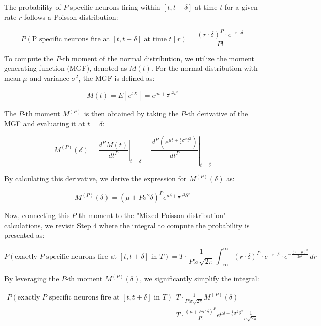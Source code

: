 The probability of \(P\) specific neurons firing within \([t, t + \delta]\) at time \(t\) for a given rate \(r\) follows a Poisson distribution:

\begin{equation}
P(\text{P specific neurons fire at } [t, t + \delta] \text{ at time } t \mid r) = \frac{{(r \cdot \delta)^P \cdot e^{-r \cdot \delta}}}{{P!}}
\end{equation}

To compute the \(P\)-th moment of the normal distribution, we utilize the moment generating function (MGF), denoted as \(M(t)\). For the normal distribution with mean \(\mu\) and variance \(\sigma^2\), the MGF is defined as:

\begin{equation}
M(t) = E[e^{tX}] = e^{\mu t + \frac{1}{2}\sigma^2 t^2}
\end{equation}

The \(P\)-th moment \(M^{(P)}\) is then obtained by taking the \(P\)-th derivative of the MGF and evaluating it at \(t = \delta\):

\begin{equation}
M^{(P)}(\delta) = \left. \frac{{d^P M(t)}}{{dt^P}} \right|_{t=\delta} = \left. \frac{{d^P \left( e^{\mu t + \frac{1}{2}\sigma^2 t^2} \right)}}{{dt^P}} \right|_{t=\delta}
\end{equation}

By calculating this derivative, we derive the expression for \(M^{(P)}(\delta)\) as:

\begin{equation}
M^{(P)}(\delta) = (\mu + P\sigma^2\delta)^P e^{\mu\delta + \frac{1}{2}\sigma^2 \delta^2}
\end{equation}

Now, connecting this \(P\)-th moment to the "Mixed Poisson distribution" calculations, we revisit Step 4 where the integral to compute the probability is presented as:

\begin{equation}
P(\text{exactly } P \text{ specific neurons fire at } [t, t + \delta] \text{ in } T) = T \cdot \frac{1}{P! \sigma \sqrt{2\pi}} \int_{-\infty}^{\infty} (r \cdot \delta)^P \cdot e^{-r \cdot \delta} \cdot e^{-\frac{(r-\mu)^2}{2\sigma^2}} \, dr
\end{equation}

By leveraging the \(P\)-th moment \(M^{(P)}(\delta)\), we significantly simplify the integral:

\begin{equation}
\begin{aligned}
P(\text{exactly } P \text{ specific neurons fire at } [t, t + \delta] \text{ in } T) &= T \cdot \frac{1}{P! \sigma \sqrt{2\pi}} M^{(P)}(\delta) \\
&= T \cdot \frac{(\mu + P\sigma^2\delta)^P}{P!} e^{\mu\delta + \frac{1}{2}\sigma^2 \delta^2} \frac{1}{\sigma \sqrt{2\pi}}
\end{aligned}
\end{equation}

